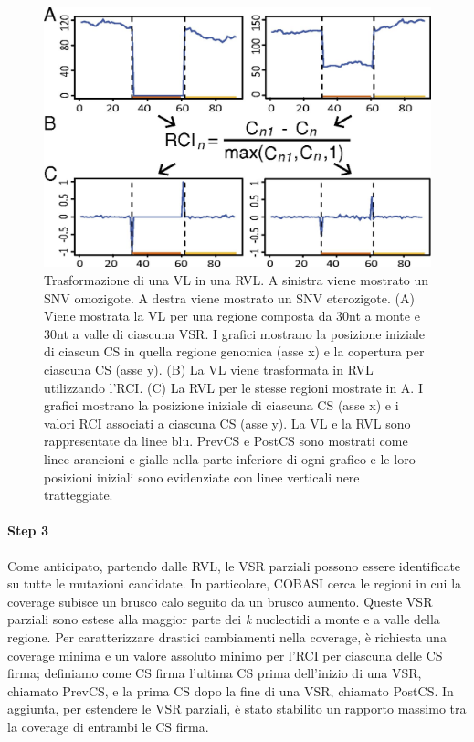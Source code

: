 \documentclass[../main.tex]{subfiles}
\begin{document}
\begin{figure}[ht!]
	\centering
  	\captionsetup{justification=justified}
  	\includegraphics[scale=.80]{images/cobasi_rci.jpg}
  	\caption{Trasformazione di una VL in una RVL. A sinistra viene mostrato un SNV omozigote. A destra viene mostrato un SNV eterozigote. (A) Viene mostrata la VL per una regione composta da 30nt a monte e 30nt a valle di ciascuna VSR. I grafici mostrano la posizione iniziale di ciascun CS in quella regione genomica (asse x) e la copertura per ciascuna CS (asse y). (B) La VL viene trasformata in RVL utilizzando l'RCI. (C) La RVL per le stesse regioni mostrate in A. I grafici mostrano la posizione iniziale di ciascuna CS (asse x) e i valori RCI associati a ciascuna CS (asse y). La VL e la RVL sono rappresentate da linee blu. PrevCS e PostCS sono mostrati come linee arancioni e gialle nella parte inferiore di ogni grafico e le loro posizioni iniziali sono evidenziate con linee verticali nere tratteggiate. }
  	\label{fig:cobasi_rci}
\end{figure}

\paragraph{Step 3} Come anticipato, partendo dalle RVL, le VSR parziali possono essere identificate su tutte le mutazioni candidate. In particolare, COBASI cerca le regioni in cui la coverage subisce un brusco calo seguito da un brusco aumento. Queste VSR parziali sono estese alla maggior parte dei \textit{k} nucleotidi a monte e a valle della regione. Per caratterizzare drastici cambiamenti nella coverage, è richiesta una coverage minima e un valore assoluto minimo per l'RCI per ciascuna delle CS firma; definiamo come CS firma l'ultima CS prima dell'inizio di una VSR, chiamato PrevCS, e la prima CS dopo la fine di una VSR, chiamato  PostCS. In aggiunta, per estendere le VSR parziali, è stato stabilito un rapporto massimo tra la coverage di entrambi le CS firma. 
\end{document}
